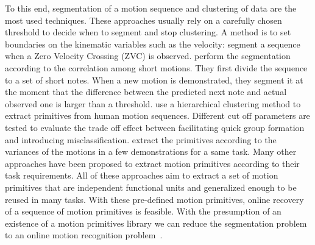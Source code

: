 To this end, segmentation of a motion sequence \citep{takano2006humanoid,Pais2013ID879} and clustering of data \citep{kulic2009online,kulic2012incremental} are the most used techniques. These approaches usually rely on a carefully chosen threshold to decide when to segment and stop clustering. A method is to set boundaries on the kinematic variables such as the velocity: \citet{fod2002automated} segment a sequence when a Zero Velocity Crossing (ZVC) is observed. \citet{takano2006humanoid} perform the segmentation according to the correlation among short motions. They first divide the sequence to a set of short notes. When a new motion is demonstrated, they segment it at the moment that the difference between the predicted next note and actual observed one is larger than a threshold. \citet{kulic2008incremental} use a hierarchical clustering method to extract primitives from human motion sequences. Different cut off parameters are tested to evaluate the trade off effect between facilitating quick group formation and introducing misclassification. \citet{Pais2013ID879} extract the primitives according to the variances of the motions in a few demonstrations for a same task. Many other approaches have been proposed to extract motion primitives according to their task requirements. All of these approaches aim to extract a set of motion primitives that are independent functional units and generalized enough to be reused in many tasks. With these pre-defined motion primitives, online recovery of a sequence of motion primitives is feasible. With the presumption of an existence of a motion primitives library we can reduce the segmentation problem to an online motion recognition problem~\citet{meier2011movement}.


